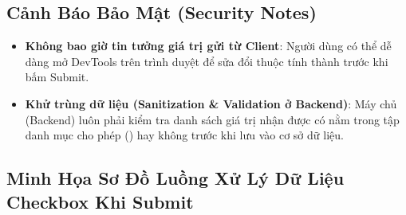 \subsection{Cảnh Báo Bảo Mật (Security Notes)}

\begin{warnBox}
\begin{itemize}[leftmargin=1.5em, itemsep=2pt, parsep=0pt]
    \item \textbf{Không bao giờ tin tưởng giá trị  gửi từ Client}: Người dùng có thể dễ dàng mở DevTools trên trình duyệt để sửa đổi thuộc tính  thành  trước khi bấm Submit.
    \item \textbf{Khử trùng dữ liệu (Sanitization \& Validation ở Backend)}: Máy chủ (Backend) luôn phải kiểm tra danh sách giá trị nhận được có nằm trong tập danh mục cho phép () hay không trước khi lưu vào cơ sở dữ liệu.
\end{itemize}
\end{warnBox}

\subsection{Minh Họa Sơ Đồ Luồng Xử Lý Dữ Liệu Checkbox Khi Submit}

